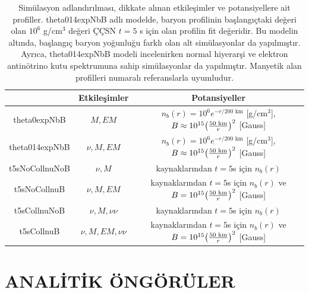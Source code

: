 \begin{table}[hbt!]
    \centering
    \begin{tabular}{|c|c|c|}
        \hline
         & \textbf{Etkileşimler} & \textbf{Potansiyeller} \\ 
        \hline
        \small{theta0expNbB}   & $M,EM$  & \footnotesize{$n_{b}(r)=10^{6} e^{-r/200 \text{ km}} $ [g/cm$^{3}$], $B\approx 10^{15} \qty(\frac{50 \text{ km}}{r})^{2}$  [Gauss]}\\
        \hline
        \small{theta014expNbB} & $\nu,M,EM$  & \footnotesize{$n_{b}(r)=10^{6} e^{-r/200 \text{ km}} $ [g/cm$^{3}$], $B\approx 10^{15} \qty(\frac{50 \text{ km}}{r})^{2}$  [Gauss]}\\
        \hline
        \small{t5sNoCollnuNoB}  & $\nu,M$ & \cite{1987ESOC...26..325N, Athar:1995cx} kaynaklarından $ t=5 $s için $n_{b}(r)$\\
        \hline
        \small{t5sNoCollnuB}   & $\nu,M,EM$  &\tiny{\cite{1987ESOC...26..325N, Athar:1995cx} kaynaklarından $ t=5 $s için $n_{b}(r)$ ve $B= 10^{15} \qty(\frac{50 \text{ km}}{r})^{2}$ [Gauss]}\\
        \hline
        \small{t5sCollnuNoB}   & $\nu,M,\nu\nu$ &\cite{1987ESOC...26..325N, Athar:1995cx} kaynaklarından $ t=5 $s için $n_{b}(r)$\\
        \hline
        \small{t5sCollnuB}     & $\nu,M,EM, \nu\nu$ &\tiny{\cite{1987ESOC...26..325N, Athar:1995cx} kaynaklarından $ t=5 $s için $n_{b}(r)$ ve $B= 10^{15} \qty(\frac{50 \text{ km}}{r})^{2}$ [Gauss]}\\
        \hline
    \end{tabular}
    \caption[Simülasyon Adlandırılması, Etkileşimler Ve Potansiyeller.]{\label{tab:simulasyonlar}Simülasyon adlandırılması, dikkate alınan etkileşimler ve potansiyellere ait profiller. theta014expNbB adlı modelde, baryon profilinin başlangıçtaki değeri olan $ 10^{6} $ g/cm$^{3}$ değeri ÇÇSN $t=5$ s için olan profilin fit değeridir. Bu modelin altında, başlangıç baryon yoğunluğu farklı olan alt simülasyonlar da yapılmıştır. Ayrıca, theta014expNbB modeli incelenirken normal hiyerarşi ve elektron antinötrino kutu spektrumuna sahip simülasyonlar da yapılmıştır. Manyetik alan profilleri \cite{deGouvea:2012hg,deGouvea:2013zp,Kharlanov:2020cti} numaralı referanslarla uyumludur.}
\end{table}

\section{ANALİTİK ÖNGÖRÜLER}\label{sec:evrim}
